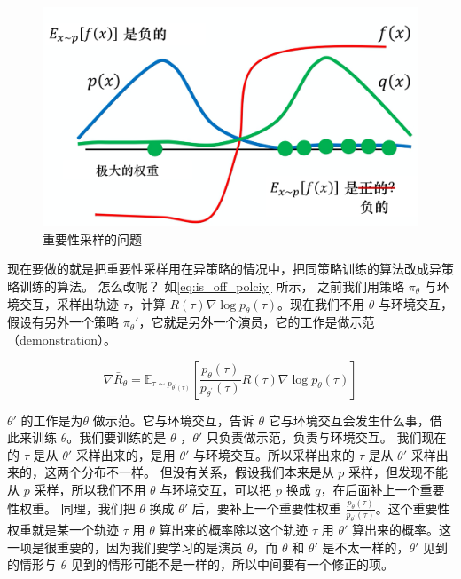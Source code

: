 \begin{figure}[htb]
    \centering
    \includegraphics[width=0.5\linewidth]{res/ch5/5.4}
    \caption{重要性采样的问题}
    \label{fig:fig5.4}
\end{figure}

现在要做的就是把重要性采样用在异策略的情况中，把同策略训练的算法改成异策略训练的算法。
怎么改呢？
如\eqref{eq:is_off_polciy} 所示，
之前我们用策略 $\pi_{\theta}$ 与环境交互，采样出轨迹 $\tau$，计算 $R(\tau) \nabla \log p_{\theta}(\tau)$。现在我们不用 $\theta$ 与环境交互，假设有另外一个策略 $\pi_{\theta}'$，它就是另外一个演员，它的工作是做示范（demonstration）。

\begin{equation}
    \label{eq:is_off_polciy}
    \nabla \bar{R}_{\theta}=\mathbb{E}_{\tau \sim p_{\theta^{\prime}(\tau)}}\left[\frac{p_{\theta}(\tau)}{p_{\theta^{\prime}}(\tau)} R(\tau) \nabla \log p_{\theta}(\tau)\right]
\end{equation}

$\theta'$ 的工作是为$\theta$ 做示范。它与环境交互，告诉 $\theta$ 它与环境交互会发生什么事，借此来训练 $\theta$。我们要训练的是 $\theta$ ，$\theta'$  只负责做示范，负责与环境交互。
我们现在的 $\tau$ 是从 $\theta'$ 采样出来的，是用 $\theta'$ 与环境交互。所以采样出来的 $\tau$ 是从 $\theta'$ 采样出来的，这两个分布不一样。
但没有关系，假设我们本来是从 $p$ 采样，但发现不能从 $p$ 采样，所以我们不用 $\theta$ 与环境交互，可以把 $p$ 换成 $q$，在后面补上一个重要性权重。
同理，我们把 $\theta$ 换成 $\theta'$ 后，要补上一个重要性权重 $\frac{p_{\theta}(\tau)}{p_{\theta^{\prime}}(\tau)}$。这个重要性权重就是某一个轨迹 $\tau$ 用 $\theta$ 算出来的概率除以这个轨迹 $\tau$ 用 $\theta'$ 算出来的概率。这一项是很重要的，因为我们要学习的是演员 $\theta$，而 $\theta$ 和 $\theta'$ 是不太一样的，$\theta'$ 见到的情形与 $\theta$ 见到的情形可能不是一样的，所以中间要有一个修正的项。


